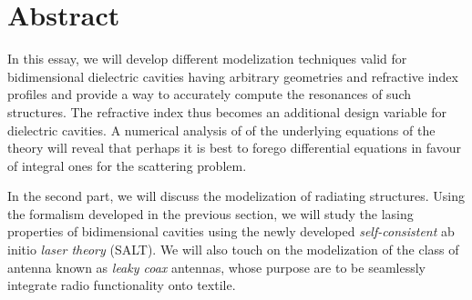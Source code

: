 \chapter*{Abstract}


In this essay, we will develop different modelization techniques valid 
for bidimensional dielectric cavities having arbitrary geometries and refractive index profiles and provide
a way to accurately compute the resonances of such structures. The refractive
index thus becomes an additional design variable for dielectric cavities.
A numerical analysis of of the underlying equations of the theory will
reveal that perhaps it is best to forego differential equations 
in favour of integral ones for the scattering problem. 

In the second part, we will discuss the modelization of radiating structures. 
Using the formalism developed in the previous section, we will study the 
lasing properties of bidimensional cavities using the newly developed
\textit{self-consistent} ab initio \textit{laser theory} (SALT). We will also
touch on the modelization of the class of antenna known as \textit{leaky coax} antennas, 
whose purpose are to be seamlessly integrate radio functionality onto textile.
